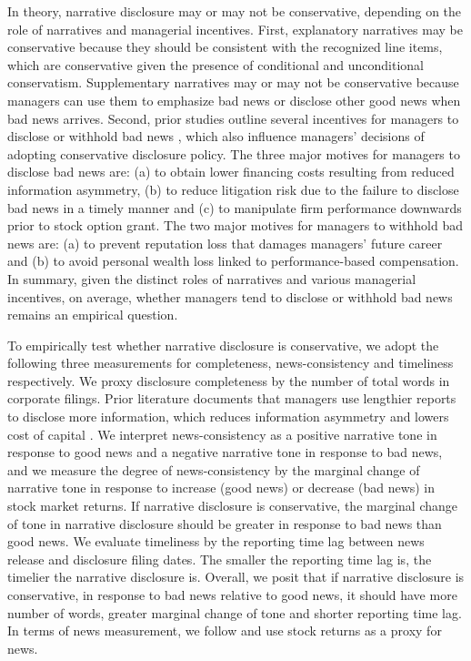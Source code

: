 \documentclass[a4paper]{article}
\begin{document}
\begin{spacing}{2}
In theory, narrative disclosure may or may not be conservative, depending on the role of narratives and managerial incentives. First, explanatory narratives may be conservative because they should be consistent with the recognized line items, which are conservative given the presence of conditional and unconditional conservatism. Supplementary narratives may or may not be conservative because managers can use them to emphasize bad news or disclose other good news when bad news arrives. Second, prior studies outline several incentives for managers to disclose or withhold bad news \cite{skinnerWhyFirmsVoluntarily1994, skinnerEarningsDisclosuresStockholder1997, kothariManagersWithholdBad2009, baoManagersDiscloseWithhold2019}, which also influence managers' decisions of adopting conservative disclosure policy. The three major motives for managers to disclose bad news are: (a) to obtain lower financing costs resulting from reduced information asymmetry, (b) to reduce litigation risk due to the failure to disclose bad news in a timely manner and (c) to manipulate firm performance downwards prior to stock option grant. The two major motives for managers to withhold bad news are: (a) to prevent reputation loss that damages managers' future career and (b) to avoid personal wealth loss linked to performance-based compensation. In summary, given the distinct roles of narratives and various managerial incentives, on average, whether managers tend to disclose or withhold bad news remains an empirical question.

To empirically test whether narrative disclosure is conservative, we adopt the following three measurements for completeness, news-consistency and timeliness respectively. We proxy disclosure completeness by the number of total words in corporate filings. Prior literature documents that managers use lengthier reports to disclose more information, which reduces information asymmetry and lowers cost of capital . We interpret news-consistency as a positive narrative tone in response to good news and a negative narrative tone in response to bad news, and we measure the degree of news-consistency by the marginal change of narrative tone in response to increase (good news) or decrease (bad news) in stock market returns. If narrative disclosure is conservative, the marginal change of tone in narrative disclosure should be greater in response to bad news than good news. We evaluate timeliness by the reporting time lag between news release and disclosure filing dates. The smaller the reporting time lag is, the timelier the narrative disclosure is. Overall, we posit that if narrative disclosure is conservative, in response to bad news relative to good news, it should have more number of words, greater marginal change of tone and shorter reporting time lag. In terms of news measurement, we follow  and use stock returns as a proxy for news.


\end{spacing}
\end{document}
